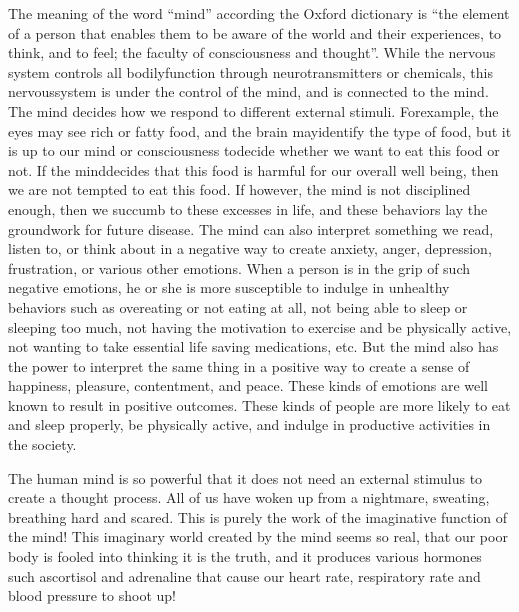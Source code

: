 The meaning of the word “mind” according the Oxford dictionary is “the element of a person that enables them to be aware of the world and their experiences, to think, and to feel; the faculty of consciousness and thought”. While the nervous system controls all bodily\break function through neurotransmitters or chemicals, this nervous\break system is under the control of the mind, and is connected to the mind. The mind decides how we respond to different external stimuli. For\break example, the eyes may see rich or fatty food, and the brain may\break identify the type of food, but it is up to our mind or consciousness to\break decide whether we want to eat this food or not. If the mind\break decides that this food is harmful for our overall well being, then we are not tempted to eat this food. If however, the mind is not disciplined enough, then we succumb to these excesses in life, and these behaviors lay the groundwork for future disease. The mind can also interpret something we read, listen to, or think about in a negative way to create anxiety, anger, depression, frustration, or various other emotions. When a person is in the grip of such negative emotions, he or she is more susceptible to indulge in unhealthy behaviors such as overeating or not eating at all, not being able to sleep or sleeping too much, not having the motivation to exercise and be physically active, not wanting to take essential life saving medications, etc. But the mind also has the power to interpret the same thing in a positive way to create a sense of happiness, pleasure, contentment, and peace. These kinds of emotions are well known to result in positive outcomes. These kinds of people are more likely to eat and sleep properly, be physically active, and indulge in productive activities in the society.

The human mind is so powerful that it does not need an external stimulus to create a thought process. All of us have woken up from a nightmare, sweating, breathing hard and scared. This is purely the work of the imaginative function of the mind! This imaginary world created by the mind seems so real, that our poor body is fooled into thinking it is the truth, and it produces various hormones such as\break cortisol and adrenaline that cause our heart rate, respiratory rate and blood pressure to shoot up!

